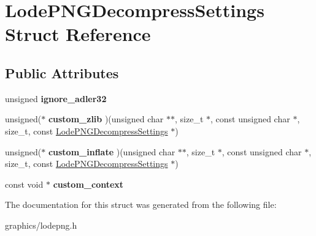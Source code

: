 \hypertarget{struct_lode_p_n_g_decompress_settings}{\section{Lode\+P\+N\+G\+Decompress\+Settings Struct Reference}
\label{struct_lode_p_n_g_decompress_settings}
}
\subsection*{Public Attributes}
\begin{DoxyCompactItemize}
\item 
\hypertarget{struct_lode_p_n_g_decompress_settings_afab4b919650b51b4d2f175a60ed6c580}{unsigned {\bfseries ignore\+\_\+adler32}}\label{struct_lode_p_n_g_decompress_settings_afab4b919650b51b4d2f175a60ed6c580}

\item 
\hypertarget{struct_lode_p_n_g_decompress_settings_abc40604f104a1b2f6d64359c692c09e8}{unsigned($\ast$ {\bfseries custom\+\_\+zlib} )(unsigned char $\ast$$\ast$, size\+\_\+t $\ast$, const unsigned char $\ast$, size\+\_\+t, const \hyperlink{struct_lode_p_n_g_decompress_settings}{Lode\+P\+N\+G\+Decompress\+Settings} $\ast$)}\label{struct_lode_p_n_g_decompress_settings_abc40604f104a1b2f6d64359c692c09e8}

\item 
\hypertarget{struct_lode_p_n_g_decompress_settings_a6e3d0cc225a66bba82a5b6ef9209b515}{unsigned($\ast$ {\bfseries custom\+\_\+inflate} )(unsigned char $\ast$$\ast$, size\+\_\+t $\ast$, const unsigned char $\ast$, size\+\_\+t, const \hyperlink{struct_lode_p_n_g_decompress_settings}{Lode\+P\+N\+G\+Decompress\+Settings} $\ast$)}\label{struct_lode_p_n_g_decompress_settings_a6e3d0cc225a66bba82a5b6ef9209b515}

\item 
\hypertarget{struct_lode_p_n_g_decompress_settings_a66e3608b541c64bb275c0ac1a80c3ec6}{const void $\ast$ {\bfseries custom\+\_\+context}}\label{struct_lode_p_n_g_decompress_settings_a66e3608b541c64bb275c0ac1a80c3ec6}

\end{DoxyCompactItemize}


The documentation for this struct was generated from the following file\+:\begin{DoxyCompactItemize}
\item 
graphics/lodepng.\+h\end{DoxyCompactItemize}
